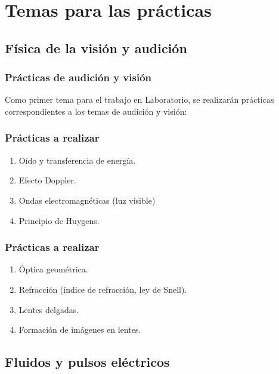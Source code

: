 \documentclass[14pt]{beamer}
\begin{document}
\section{Temas para las prácticas}
\subsection{Física de la visión y audición}

\begin{frame}
\frametitle{Prácticas de audición y visión}
Como primer tema para el trabajo en Laboratorio, se realizarán prácticas correspondientes a los temas de audición y visión:
\end{frame}
\begin{frame}
\frametitle{Prácticas a realizar}
\begin{enumerate}[<+->]
\item Oído y transferencia de energía.
\item Efecto Doppler.
\item Ondas electromagnéticas (luz visible)
\item Principio de Huygens.
\seti
\end{enumerate}
\end{frame}
\begin{frame}
\frametitle{Prácticas a realizar}
\begin{enumerate}[<+->]
\conti
\item Óptica geométrica.
\item Refracción (índice de refracción, ley de Snell).
\item Lentes delgadas.
\item Formación de imágenes en lentes.
\end{enumerate}
\end{frame}

\subsection{Fluidos y pulsos eléctricos}
\end{document}
